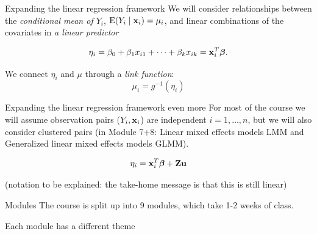 \documentclass[
  ignorenonframetext,
]{beamer}
\begin{document}
\begin{frame}
\begin{block}{Expanding the linear regression framework}
\label{expanding-the-linear-regression-framework}
We will consider relationships between the \emph{conditional mean of
\(Y_i\)}, \(\text{E}(Y_i\mid {\bf x}_i)=\mu_i\), and linear combinations
of the covariates in \emph{a linear predictor}

\[
\eta_i=\beta_0+\beta_1 x_{i1}+\cdots +\beta_k x_{ik}={\bf x}_i^T \boldsymbol{\beta}.
\]

We connect \(\eta_i\) and \(\mu\) through a \emph{link function}:
\[\mu_i = g^{-1}(\eta_i)\]
\end{block}
\end{frame}

\begin{frame}
\begin{block}{Expanding the linear regression framework even more}
\label{expanding-the-linear-regression-framework-even-more}
For most of the course we will assume observation pairs
(\(Y_i,{\bf x}_i\)) are independent \(i=1,\ldots,n\), but we will also
consider clustered pairs (in Module 7+8: Linear mixed effects models LMM
and Generalized linear mixed effects models GLMM).

\[
\eta_i={\bf x}_i^T \boldsymbol{\beta} + \bf{Z} u
\]

(notation to be explained: the take-home message is that this is still
linear)
\end{block}
\end{frame}

\begin{frame}
\begin{block}{Modules}
\label{modules}
The course is split up into 9 modules, which take 1-2 weeks of class.

Each module has a different theme
\end{block}
\end{frame}
\end{document}
